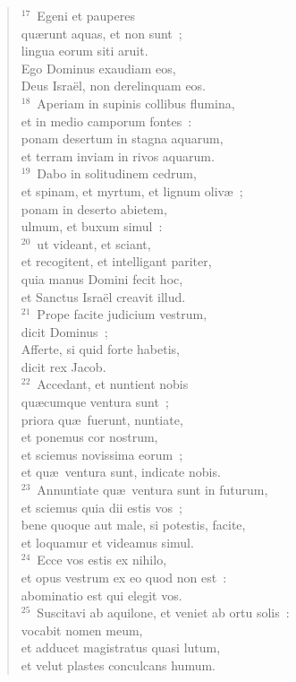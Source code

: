 \begin{verse}
${}^{17}$~Egeni et pauperes\\ qu\ae runt aquas, et non sunt~;\\ lingua eorum siti aruit.\\ Ego Dominus exaudiam eos,\\ Deus Isra\"el, non derelinquam eos.\\
${}^{18}$~Aperiam in supinis collibus flumina,\\ et in medio camporum fontes~:\\ ponam desertum in stagna aquarum,\\ et terram inviam in rivos aquarum.\\
${}^{19}$~Dabo in solitudinem cedrum,\\ et spinam, et myrtum, et lignum oliv\ae~;\\ ponam in deserto abietem,\\ ulmum, et buxum simul~:\\
${}^{20}$~ut videant, et sciant,\\ et recogitent, et intelligant pariter,\\ quia manus Domini fecit hoc,\\ et Sanctus Isra\"el creavit illud.\\
${}^{21}$~Prope facite judicium vestrum,\\ dicit Dominus~;\\ Afferte, si quid forte habetis,\\ dicit rex Jacob.\\
${}^{22}$~Accedant, et nuntient nobis\\ qu\ae cumque ventura sunt~;\\ priora qu\ae\ fuerunt, nuntiate,\\ et ponemus cor nostrum,\\ et sciemus novissima eorum~;\\ et qu\ae\ ventura sunt, indicate nobis.\\
${}^{23}$~Annuntiate qu\ae\ ventura sunt in futurum,\\ et sciemus quia dii estis vos~;\\ bene quoque aut male, si potestis, facite,\\ et loquamur et videamus simul.\\
${}^{24}$~Ecce vos estis ex nihilo,\\ et opus vestrum ex eo quod non est~:\\ abominatio est qui elegit vos.\\
${}^{25}$~Suscitavi ab aquilone, et veniet ab ortu solis~:\\ vocabit nomen meum,\\ et adducet magistratus quasi lutum,\\ et velut plastes conculcans humum.\\

\end{verse}
